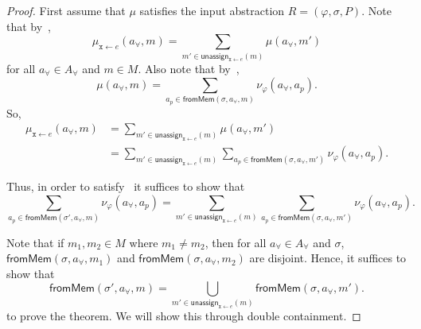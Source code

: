 \documentclass[acmsmall,review,anonymous]{acmart}\settopmatter{printfolios=true,printccs=false,printacmref=false}
\begin{document}
\soundnessAssignment*
\begin{proof}
  First assume that $\mu$ satisfies the input abstraction $R=(\varphi,\sigma,P)$. Note that by~,
  \[
    \mu_{\mathtt{x}\gets e}(a_{\forall},m) = \displaystyle\sum_{m' \in \mathsf{unassign}_{\mathtt{x}\gets e}(m)} \mu(a_{\forall},m')
  \]
  for all $a_{\forall} \in \mathit{A}_{\forall}$ and $m \in \mathit{M}$. Also note that by~,
  \[
    \mu(a_{\forall},m) = \displaystyle\sum_{a_p \in \mathsf{fromMem}(\sigma,a_{\forall},m)} \nu_{\varphi}(a_{\forall},a_p).
  \]
  So,
  \begin{align*}
    \mu_{\mathtt{x}\gets e}(a_{\forall},m) &= \sum_{m' \in \mathsf{unassign}_{\mathtt{x}\gets e}(m)} \mu(a_{\forall},m')\\
                                           &= \sum_{m' \in \mathsf{unassign}_{\mathtt{x}\gets e}(m)} \sum_{a_p \in \mathsf{fromMem}(\sigma,a_{\forall},m')} \nu_{\varphi}(a_{\forall},a_p).
  \end{align*}

  Thus, in order to satisfy~ it suffices to show that
  \[
    \sum_{a_p \in \mathsf{fromMem}(\sigma',a_{\forall},m)} \nu_{\varphi}(a_{\forall},a_p) = \sum_{m' \in \mathsf{unassign}_{\mathtt{x}\gets e}(m)} \sum_{a_p \in \mathsf{fromMem}(\sigma,a_{\forall},m')} \nu_{\varphi}(a_{\forall},a_p).
  \]

  Note that if $m_1,m_2 \in \mathit{M}$ where $m_1 \neq m_2$, then for all $a_{\forall} \in \mathit{A}_{\forall}$ and $\sigma$, $\mathsf{fromMem}(\sigma,a_{\forall},m_1)$ and $\mathsf{fromMem}(\sigma,a_{\forall},m_2)$ are disjoint. Hence, it suffices to show that
  \[
    \mathsf{fromMem}(\sigma',a_{\forall},m) = \bigcup_{m' \in \mathsf{unassign}_{\mathtt{x}\gets e}(m)} \mathsf{fromMem}(\sigma,a_{\forall},m').
  \]
  to prove the theorem. We will show this through double containment.



\end{proof}
\end{document}
